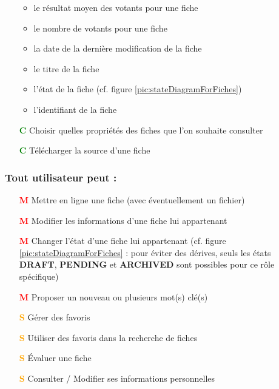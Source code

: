 \begin{itemize}
            \begin{itemize}
            \item le résultat moyen des votants pour une \gls{fiche}
            \item le nombre de votants pour une \gls{fiche}
            \item la date de la dernière modification de la \gls{fiche}
            \item le titre de la \gls{fiche}
            \item l'état de la \gls{fiche} (cf. figure \ref{pic:stateDiagramForFiches})
            \item l'identifiant de la \gls{fiche}
        \end{itemize}
    \item[\textcolor{green}{\textbf{C}}] Choisir quelles propriétés des \glspl{fiche} que l'on souhaite consulter
    \item[\textcolor{green}{\textbf{C}}] Télécharger la source d'une \gls{fiche} 
\end{itemize}

\subsubsection*{Tout utilisateur peut : }
\begin{itemize}
    \item[\textcolor{red}{\textbf{M}}] Mettre en ligne une \gls{fiche}  (avec éventuellement un fichier)
    \item[\textcolor{red}{\textbf{M}}] Modifier les informations d'une \gls{fiche}  lui appartenant
    \item[\textcolor{red}{\textbf{M}}] Changer l'état d'une \gls{fiche} lui appartenant (cf. figure \ref{pic:stateDiagramForFiches} : pour éviter des dérives, seuls les états \textbf{DRAFT}, \textbf{PENDING} et \textbf{ARCHIVED} sont possibles pour ce rôle spécifique)
    \item[\textcolor{red}{\textbf{M}}] Proposer un nouveau ou plusieurs mot(s) clé(s)
    \item[\textcolor{orange}{\textbf{S}}] Gérer des favoris
    \item[\textcolor{orange}{\textbf{S}}] Utiliser des favoris dans la recherche de \gls{fiche}s
    \item[\textcolor{orange}{\textbf{S}}] Évaluer une \gls{fiche}  
    \item[\textcolor{orange}{\textbf{S}}] Consulter / Modifier ses informations personnelles
\end{itemize}

